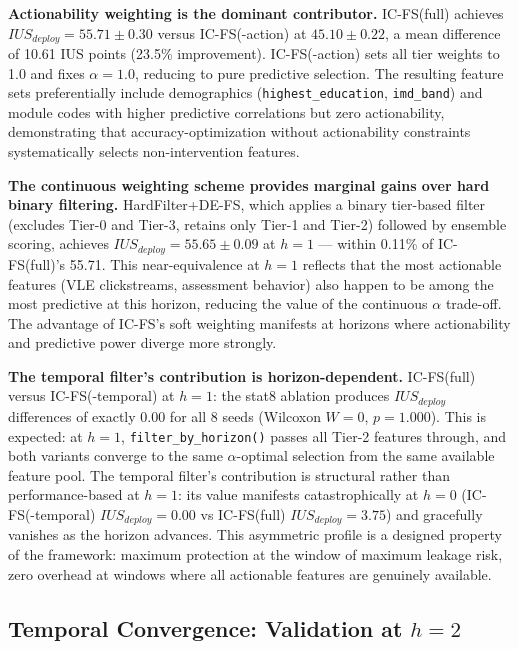 \documentclass[a4paper,fleqn]{cas-sc}
\begin{document}
\textbf{Actionability weighting is the dominant contributor.} IC-FS(full) achieves $IUS_{deploy} = 55.71 \pm 0.30$ versus IC-FS(-action) at $45.10 \pm 0.22$, a mean difference of 10.61 IUS points (23.5\% improvement). IC-FS(-action) sets all tier weights to 1.0 and fixes $\alpha=1.0$, reducing to pure predictive selection. The resulting feature sets preferentially include demographics (\texttt{highest\_education}, \texttt{imd\_band}) and module codes with higher predictive correlations but zero actionability, demonstrating that accuracy-optimization without actionability constraints systematically selects non-intervention features.

\textbf{The continuous weighting scheme provides marginal gains over hard binary filtering.} HardFilter+DE-FS, which applies a binary tier-based filter (excludes Tier-0 and Tier-3, retains only Tier-1 and Tier-2) followed by ensemble scoring, achieves $IUS_{deploy} = 55.65 \pm 0.09$ at $h=1$ --- within 0.11\% of IC-FS(full)'s 55.71. This near-equivalence at $h=1$ reflects that the most actionable features (VLE clickstreams, assessment behavior) also happen to be among the most predictive at this horizon, reducing the value of the continuous $\alpha$ trade-off. The advantage of IC-FS's soft weighting manifests at horizons where actionability and predictive power diverge more strongly.

\textbf{The temporal filter's contribution is horizon-dependent.} IC-FS(full) versus IC-FS(-temporal) at $h=1$: the stat8 ablation produces $IUS_{deploy}$ differences of exactly 0.00 for all 8 seeds (Wilcoxon $W=0$, $p=1.000$). This is expected: at $h=1$, \texttt{filter\_by\_horizon()} passes all Tier-2 features through, and both variants converge to the same $\alpha$-optimal selection from the same available feature pool. The temporal filter's contribution is structural rather than performance-based at $h=1$: its value manifests catastrophically at $h=0$ (IC-FS(-temporal) $IUS_{deploy}=0.00$ vs IC-FS(full) $IUS_{deploy}=3.75$) and gracefully vanishes as the horizon advances. This asymmetric profile is a designed property of the framework: maximum protection at the window of maximum leakage risk, zero overhead at windows where all actionable features are genuinely available.

\subsection{Temporal Convergence: Validation at $h=2$}
\end{document}
